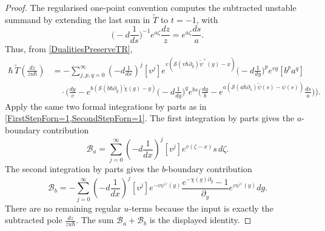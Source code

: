\documentclass[10pt,a4paper,oneside,no-math,reqno]{amsart}%
\theoremstyle{plain}
\theoremstyle{definition}
\theoremstyle{remark}
\numberwithin{equation}{section}
\newcommand{\mc}[1]{\mathcal{#1}}
\newcommand{\1}{\mathds{1}}
\newcommand{\<}{\langle}
\renewcommand{\>}{\rangle}
\newcommand{\del}{\partial}
\begin{document}
\begin{proof}
	The regularised one-point convention computes the subtracted unstable summand by extending the last sum in $\tilde{T}$ to $t=-1$, with
	\begin{equation}
		\big(-d\frac{1}{ds}\big)^{-1} e^{a\zeta}\frac{dz}{z}
		=
		e^{a\zeta}\frac{ds}{a}.
	\end{equation}
	Thus, from \cref{DualitiesPreserveTR},
	\begin{equation}
		\begin{split}
			\hbar\,\tilde{T}\left(\frac{dz}{zu\hbar}\right)
			&=
			-\sum_{j,p,q=0}^\infty (-d \frac{1}{dx})^j [v^j]
			e^{v ( \mc{S}(v\hbar \del_y)\tilde{\psi}^\vee(y)-x)}
			\big(-d\frac{1}{dy}\big)^p e^{vg}[b^p a^q]
			\\
			&\quad\cdot
			\Bigg(
			\frac{dy}{v}
			-
			e^{b(\mc{S}(b\hbar\del_g)\tilde{\chi}(g)-y)}
			\big(-d\frac{1}{dg}\big)^q e^{bs}
			\bigg(
			\frac{dg}{b}
			-
			e^{a(\mc{S}(a\hbar\del_s)\tilde{\psi}(s)-\psi(s))}
			\frac{ds}{a}
			\bigg)
			\Bigg).
		\end{split}
	\end{equation}
	Apply the same two formal integrations by parts as in \cref{FirstStepForn=1,SecondStepForn=1}. The first integration by parts gives the $a$-boundary contribution
	\begin{equation}
		\mathcal{B}_a
		=
		\sum_{j=0}^\infty (-d \frac{1}{dx})^j [v^j] e^{v(\zeta-x)}s\,d\zeta .
	\end{equation}
	The second integration by parts gives the $b$-boundary contribution
	\begin{equation}
		\mathcal{B}_b
		=
		-\sum_{j=0}^\infty (-d \frac{1}{dx})^j [v^j]
		e^{-v\psi^\vee(y)}\frac{e^{-\chi(g)\del_y}-1}{\del_y}e^{v\psi^\vee(y)}dg .
	\end{equation}
	There are no remaining regular $u$-terms because the input is exactly the subtracted pole $\frac{dz}{zu\hbar}$. The sum $\mathcal{B}_a+\mathcal{B}_b$ is the displayed identity.
\end{proof}
\end{document}
